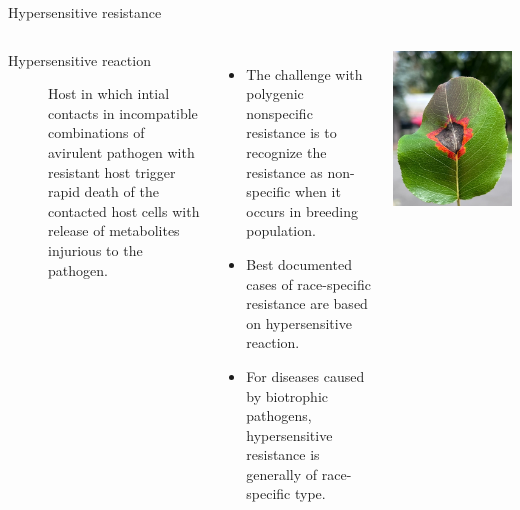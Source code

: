 \documentclass[11pt,dvipsnames,ignorenonframetext,aspectratio=169]{beamer}
\providecommand{\tightlist}{%
  \setlength{\itemsep}{0pt}\setlength{\parskip}{0pt}}
\newcommand{\bcolumns}{\begin{columns}[T, onlytextwidth]}
\newcommand{\ecolumns}{\end{columns}}
\begin{document}
\begin{frame}{Hypersensitive resistance}
\protect\hypertarget{hypersensitive-resistance}{}
\bcolumns
{}
\begin{description}
\item[Hypersensitive reaction] Host in which intial contacts in incompatible combinations of avirulent pathogen with resistant host trigger rapid death of the contacted host cells with release of metabolites injurious to the pathogen.
\end{description}

\small

\begin{itemize}
\tightlist
\item
  The challenge with polygenic nonspecific resistance is to recognize
  the resistance as non-specific when it occurs in breeding population.
\item
  Best documented cases of race-specific resistance are based on
  hypersensitive reaction.
\item
  For diseases caused by biotrophic pathogens, hypersensitive resistance
  is generally of race-specific type.
\end{itemize}


\includegraphics[width=0.7\linewidth]{../images/hypersensitive_reaction}

\ecolumns
\end{frame}
\end{document}
